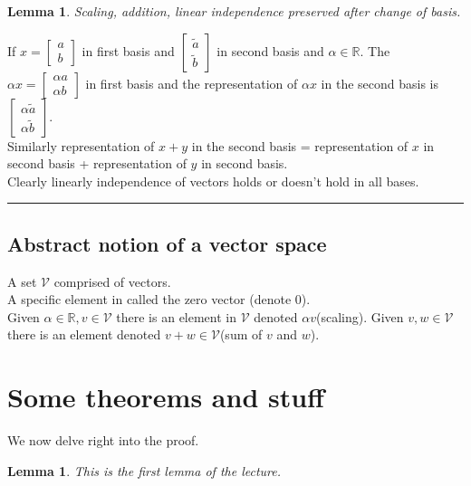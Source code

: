 \documentclass[twoside]{article}
\newtheorem{lemma}[theorem]{Lemma}
\newenvironment{proof}{{\bf Proof:}}{\hfill\rule{2mm}{2mm}}
\begin{document}
\begin{lemma}Scaling, addition, linear independence preserved after change of basis.\end{lemma}
\begin{proof}
If $x=
\begin{bmatrix}
a\\
b
\end{bmatrix}$
 in first basis and
$\begin{bmatrix}
           \widetilde{a}\\
           \widetilde{b}
\end{bmatrix}$ in second basis and $\alpha \in \mathbb{R}$.
The $\alpha x = \begin{bmatrix}
\alpha a\\
\alpha b
\end{bmatrix}$ in first basis and the representation of $\alpha x$ in the second basis is $\begin{bmatrix}
\alpha \widetilde{a}\\
\alpha \widetilde{b}
\end{bmatrix}$.\\
Similarly representation of $x +y$ in the second basis = representation of $x$ in second basis + representation of $y$ in second basis.\\
Clearly linearly independence of vectors holds or doesn't hold in all bases.
\end{proof}
\subsection{Abstract notion of a vector space}
A set $\mathcal{V}$ comprised of vectors.\\
A specific element in  called the zero vector (denote 0).\\
Given $\alpha \in \mathbb{R}, v \in  \mathcal{V}$ there is an element in  $\mathcal{V}$ denoted $\alpha v$(scaling).
Given $v,w \in  \mathcal{V}$ there is an element denoted $v+w\in  \mathcal{V}$(sum of $v$ and $w$).


\section{Some theorems and stuff}

We now delve right into the proof.

\begin{lemma}
This is the first lemma of the lecture.
\end{lemma}
\end{document}
